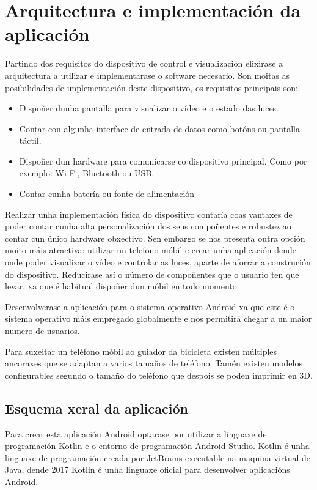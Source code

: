 \chapter{Arquitectura e implementación da aplicación}
\label{chap:implementacion_aplicacion}
Partindo dos requisitos do dispositivo de control e visualización elixirase a arquitectura a utilizar e implementarase o software necesario.
Son moitas as posibilidades de implementación deste dispositivo, os requisitos principais son:
\begin{itemize}
    \item Dispoñer dunha pantalla para visualizar o vídeo e o estado das luces.
    \item Contar con algunha interface de entrada de datos como botóns ou pantalla táctil.
    \item Dispoñer dun hardware para comunicarse co dispositivo principal. Como por exemplo: Wi-Fi, Bluetooth ou USB.
    \item Contar cunha batería ou fonte de alimentación
\end{itemize}

Realizar unha implementación física do dispositivo contaría coas vantaxes de poder contar cunha alta personalización dos seus compoñentes e robustez ao contar cun único hardware obxectivo. Sen embargo se nos presenta outra opción moito máis atractiva: utilizar un telefono móbil e crear unha aplicación dende onde poder visualizar o vídeo e controlar as luces, aparte de aforrar a construción do dispositivo. Reducirase así o número de compoñentes que o usuario ten que levar, xa que é habitual dispoñer dun móbil en todo momento.

Desenvolverase a aplicación para o sistema operativo Android xa que este é o sistema operativo máis empregado globalmente e nos permitirá chegar a un maior numero de usuarios.

Para suxeitar un teléfono móbil ao guiador da bicicleta existen múltiples ancoraxes que se adaptan a varios tamaños de teléfono. Tamén existen modelos configurables segundo o tamaño do teléfono que despois se poden imprimir en 3D.

\section{Esquema xeral da aplicación}
Para crear esta aplicación Android optarase por utilizar a linguaxe de programación Kotlin e o entorno de programación Android Studio. Kotlin é unha linguaxe de programación creada por JetBrains executable na maquina virtual de Java, dende 2017 Kotlin é unha linguaxe oficial para desenvolver aplicacións Android.

